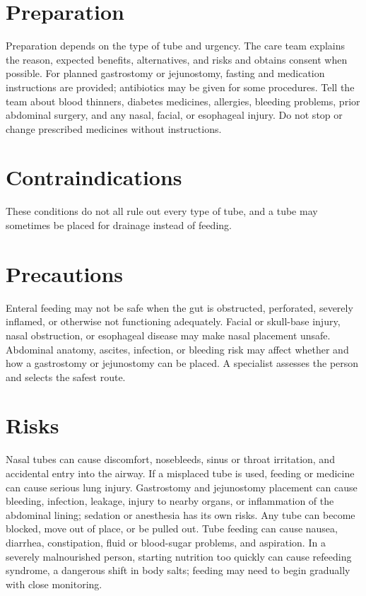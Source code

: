 \section*{Preparation}
Preparation depends on the type of tube and urgency. The care team explains the reason, expected benefits, alternatives, and risks and obtains consent when possible. For planned gastrostomy or jejunostomy, fasting and medication instructions are provided; antibiotics may be given for some procedures. Tell the team about blood thinners, diabetes medicines, allergies, bleeding problems, prior abdominal surgery, and any nasal, facial, or esophageal injury. Do not stop or change prescribed medicines without instructions.

\section*{Contraindications}
These conditions do not all rule out every type of tube, and a tube may sometimes be placed for drainage instead of feeding.

\section*{Precautions}
Enteral feeding may not be safe when the gut is obstructed, perforated, severely inflamed, or otherwise not functioning adequately. Facial or skull-base injury, nasal obstruction, or esophageal disease may make nasal placement unsafe. Abdominal anatomy, ascites, infection, or bleeding risk may affect whether and how a gastrostomy or jejunostomy can be placed. A specialist assesses the person and selects the safest route.

\section*{Risks}
Nasal tubes can cause discomfort, nosebleeds, sinus or throat irritation, and accidental entry into the airway. If a misplaced tube is used, feeding or medicine can cause serious lung injury. Gastrostomy and jejunostomy placement can cause bleeding, infection, leakage, injury to nearby organs, or inflammation of the abdominal lining; sedation or anesthesia has its own risks. Any tube can become blocked, move out of place, or be pulled out. Tube feeding can cause nausea, diarrhea, constipation, fluid or blood-sugar problems, and aspiration. In a severely malnourished person, starting nutrition too quickly can cause refeeding syndrome, a dangerous shift in body salts; feeding may need to begin gradually with close monitoring.

